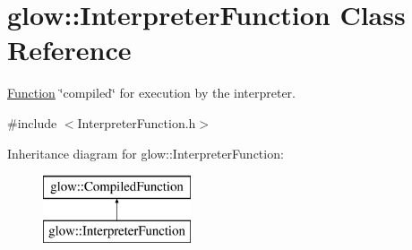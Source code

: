 \hypertarget{classglow_1_1_interpreter_function}{}\section{glow\+:\+:Interpreter\+Function Class Reference}
\label{classglow_1_1_interpreter_function}


\hyperlink{classglow_1_1_function}{Function} \char`\"{}compiled\char`\"{} for execution by the interpreter.  




{\ttfamily \#include $<$Interpreter\+Function.\+h$>$}

Inheritance diagram for glow\+:\+:Interpreter\+Function\+:\begin{figure}[H]
\begin{center}
\leavevmode
\includegraphics[height=2.000000cm]{classglow_1_1_interpreter_function}
\end{center}
\end{figure}
